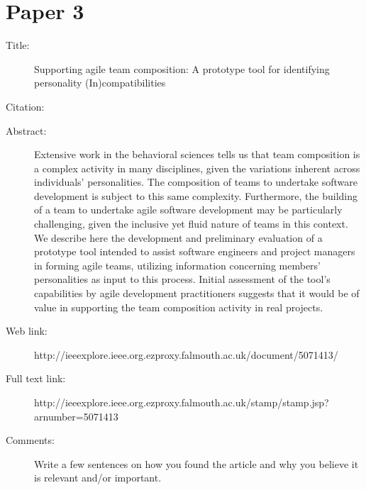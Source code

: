\documentclass{scrartcl}
\begin{document}
\section*{Paper 3}
\begin{description}
\item[Title:] Supporting agile team composition: A prototype tool for identifying personality (In)compatibilities
\item[Citation:] \cite{Paper3}
\item[Abstract:] {Extensive work in the behavioral sciences tells us that team composition is a complex activity in many disciplines, given the variations inherent across individuals' personalities. The composition of teams to undertake software development is subject to this same complexity. Furthermore, the building of a team to undertake agile software development may be particularly challenging, given the inclusive yet fluid nature of teams in this context. We describe here the development and preliminary evaluation of a prototype tool intended to assist software engineers and project managers in forming agile teams, utilizing information concerning members' personalities as input to this process. Initial assessment of the tool's capabilities by agile development practitioners suggests that it would be of value in supporting the team composition activity in real projects.}
\item[Web link:] {http://ieeexplore.ieee.org.ezproxy.falmouth.ac.uk/document/5071413/}
\item[Full text link:] {http://ieeexplore.ieee.org.ezproxy.falmouth.ac.uk/stamp/stamp.jsp?arnumber=5071413}
\item[Comments:] Write a few sentences on how you found the article and why you believe it is relevant and/or important.
\end{description}
\end{document}
